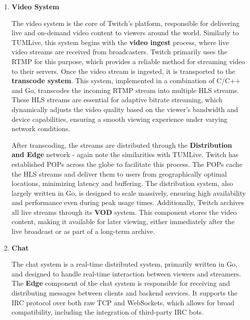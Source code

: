 \begin{enumerate}
    \item \textbf{Video System}
    
    The video system is the core of Twitch’s platform, responsible for delivering live and on-demand video content to viewers around the world. Similarly to TUMLive, this system begins with the \textbf{video ingest} process, where live video streams are received from broadcasters. Twitch primarily uses the \ac{RTMP} for this purpose, which provides a reliable method for streaming video to their servers. Once the video stream is ingested, it is transported to the \textbf{transcode system}. This system, implemented in a combination of C/C++ and Go, transcodes the incoming \ac{RTMP} stream into multiple \ac{HLS} streams. These \ac{HLS} streams are essential for adaptive bitrate streaming, which dynamically adjusts the video quality based on the viewer’s bandwidth and device capabilities, ensuring a smooth viewing experience under varying network conditions.
    
    After transcoding, the streams are distributed through the \textbf{Distribution and Edge} network - again note the similarities with TUMLive. Twitch has established \ac{POPs} across the globe to facilitate this process. The \ac{POPs} cache the \ac{HLS} streams and deliver them to users from geographically optimal locations, minimizing latency and buffering. The distribution system, also largely written in Go, is designed to scale massively, ensuring high availability and performance even during peak usage times. Additionally, Twitch archives all live streams through its \textbf{\ac{VOD}} system. This component stores the video content, making it available for later viewing, either immediately after the live broadcast or as part of a long-term archive.
    
    \item \textbf{Chat}

    The chat system is a real-time distributed system, primarily written in Go, and designed to handle real-time interaction between viewers and streamers. The \textbf{Edge} component of the chat system is responsible for receiving and distributing messages between clients and backend services. It supports the \ac{IRC} protocol over both raw TCP and WebSockets, which allows for broad compatibility, including the integration of third-party \ac{IRC} bots.
    

\end{enumerate}
